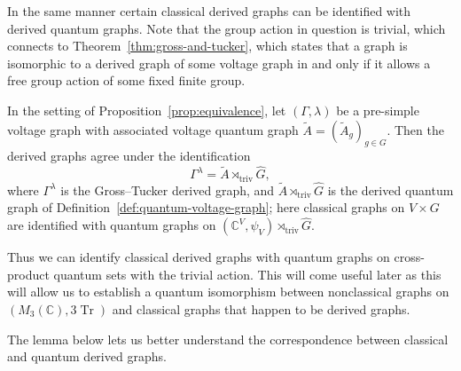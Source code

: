 In the same manner certain classical derived graphs can be identified
with derived quantum graphs. Note that the group action
in question is trivial, which connects to Theorem~\ref{thm:gross-and-tucker},
which states that a graph is isomorphic to a derived graph of some voltage
graph in and only if it allows a free group action of some fixed finite group.

\begin{proposition}
    \label{prop:derived-graph-identification}
    In the setting of Proposition~\ref{prop:equivalence},
    let \( (\Gamma,\lambda) \) be a pre-simple voltage graph with
    associated voltage quantum graph
    \( \widetilde{A} = (\widetilde{A}_g)_{g \in G} \). Then the derived graphs
    agree under the identification
    \[
        \Gamma^\lambda = \widetilde{A} \rtimes_{\mathrm{triv}} \widehat{G},
    \]
    where \( \Gamma^\lambda \) is the Gross--Tucker derived graph, and
    \( \widetilde{A} \rtimes_{\mathrm{triv}} \widehat{G} \) is the derived
    quantum graph of Definition~\ref{def:quantum-voltage-graph};
    here classical graphs on \( V \times G \) are identified with
    quantum graphs on \( (\mathbb{C}^V,\psi_V)
    \rtimes_{\mathrm{triv}} \widehat{G} \).
\end{proposition}

Thus we can identify classical derived graphs with quantum graphs
on cross-product quantum sets with the trivial action. This will
come useful later as this will allow us to establish a quantum isomorphism
between nonclassical graphs on \( (M_{3}(\mathbb{C}), 3
\operatorname{Tr}) \) and classical
graphs that happen to be derived graphs.

The lemma below lets us better understand the correspondence between classical
and quantum derived graphs.


